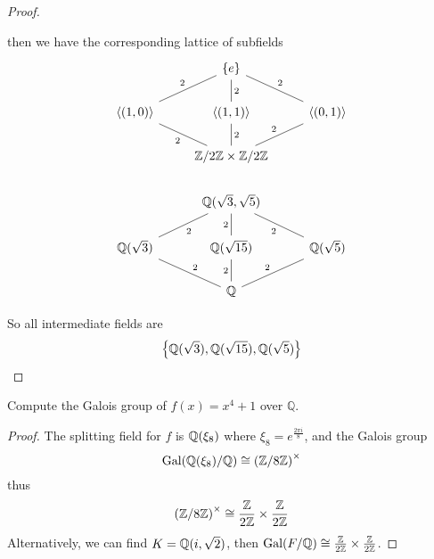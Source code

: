 \begin{proof}
\begin{itemize}
\begin{equation*}
        \end{equation*}
        then we have the corresponding lattice of subfields
        \[\begin{tikzcd}
            & {\{e\}} \\
            {\langle(1,0)\rangle} & {\langle(1,1)\rangle} & {\langle(0,1)\rangle} \\
            & {\Z/2\Z\times\Z/2\Z} \\
            & {\mathbb{Q}(\sqrt{3},\sqrt{5})} \\
            {\mathbb{Q}(\sqrt{3})} & {\mathbb{Q}(\sqrt{15})} & {\mathbb{Q}(\sqrt{5})} \\
            & {\mathbb{Q}}
            \arrow["2", no head, from=2-1, to=1-2]
            \arrow["2"', no head, from=2-1, to=3-2]
            \arrow["2"', no head, from=2-2, to=1-2]
            \arrow["2", no head, from=2-2, to=3-2]
            \arrow["2"', no head, from=2-3, to=1-2]
            \arrow["2", no head, from=3-2, to=2-3]
            \arrow["2"', no head, from=5-1, to=4-2]
            \arrow["2", no head, from=5-2, to=4-2]
            \arrow["2", no head, from=5-3, to=4-2]
            \arrow["2"', no head, from=6-2, to=5-1]
            \arrow["2", no head, from=6-2, to=5-2]
            \arrow["2", no head, from=6-2, to=5-3]
        \end{tikzcd}\]
    \end{itemize}
    So all intermediate fields are 
    \begin{equation*}
        \left\{\mathbb{Q}(\sqrt{3}), \mathbb{Q}(\sqrt{15}),\mathbb{Q}(\sqrt{5})\right\}
    \end{equation*}
\end{proof}




\begin{prob}[F2013-Q5]
    Compute the Galois group of \(f(x) = x^4 + 1\) over \(\mathbb{Q}\).
\end{prob}
\begin{proof}
    The splitting field for $f$ is $\mathbb{Q}(\xi_8)$ where $\xi_8=e^\frac{2\pi i}{8}$, and the Galois group 
    \begin{equation*}
        \text{Gal}(\mathbb{Q}(\xi_8)/\mathbb{Q})\cong\left(\mathbb{Z}/8\mathbb{Z}\right)^\times
    \end{equation*}
    thus
    \begin{equation*}
        \left(\mathbb{Z}/8\mathbb{Z}\right)^\times\cong\frac{\mathbb{Z}}{2\mathbb{Z}}\times\frac{\mathbb{Z}}{2\mathbb{Z}}
    \end{equation*}
    Alternatively, we can find $K=\mathbb{Q}(i,\sqrt{2})$, then $\text{Gal}(F/\mathbb{Q})\cong\frac{\mathbb{Z}}{2\mathbb{Z}}\times\frac{\mathbb{Z}}{2\mathbb{Z}}$.
\end{proof}



